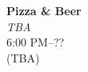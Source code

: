 \begin{calendar}{\textwidth}
{%
\textbf{Pizza \& Beer} \\ \textit{TBA} \\\vspace{0.1cm} 6:00 PM--?? \\ (TBA) \\\daysep
}



\end{calendar}

